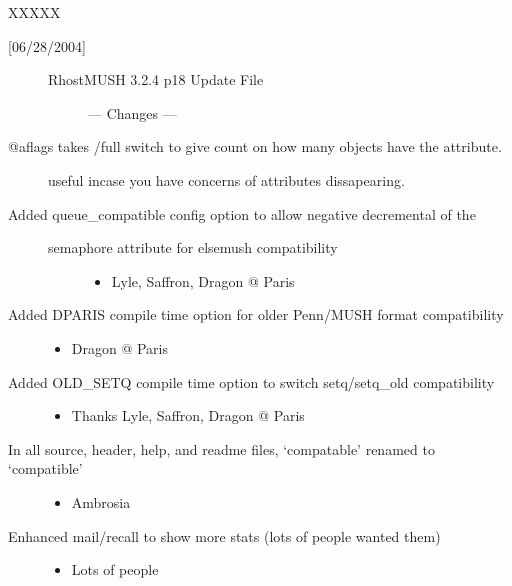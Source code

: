 \documentclass[letterpaper,10pt,english]{sphinxmanual}
\begin{document}
\sphinxAtStartPar
XXXXX
\begin{description}
\item[{{[}06/28/2004{]}}] \leavevmode\begin{description}
\item[{RhostMUSH 3.2.4 p18 Update File}] \leavevmode
\sphinxAtStartPar
—\sphinxhyphen{} Changes —\sphinxhyphen{}

\end{description}

\item[{@aflags takes /full switch to give count on how many objects have the attribute.}] \leavevmode
\sphinxAtStartPar
useful incase you have concerns of attributes dissapearing.

\item[{Added queue\_compatible config option to allow negative decremental of the}] \leavevmode\begin{description}
\item[{semaphore attribute for elsemush compatibility}] \leavevmode\begin{itemize}
\item {} 
\sphinxAtStartPar
Lyle, Saffron, Dragon @ Paris

\end{itemize}

\end{description}

\item[{Added \sphinxhyphen{}DPARIS compile time option for older Penn/MUSH format compatibility}] \leavevmode\begin{itemize}
\item {} 
\sphinxAtStartPar
Dragon @ Paris

\end{itemize}

\item[{Added \sphinxhyphen{}OLD\_SETQ compile time option to switch setq/setq\_old compatibility}] \leavevmode\begin{itemize}
\item {} 
\sphinxAtStartPar
Thanks Lyle, Saffron, Dragon @ Paris

\end{itemize}

\item[{In all source, header, help, and readme files, ‘compatable’ renamed to ‘compatible’}] \leavevmode\begin{itemize}
\item {} 
\sphinxAtStartPar
Ambrosia

\end{itemize}

\item[{Enhanced mail/recall to show more stats (lots of people wanted them)}] \leavevmode\begin{itemize}
\item {} 
\sphinxAtStartPar
Lots of people

\end{itemize}

\end{description}
\end{document}

